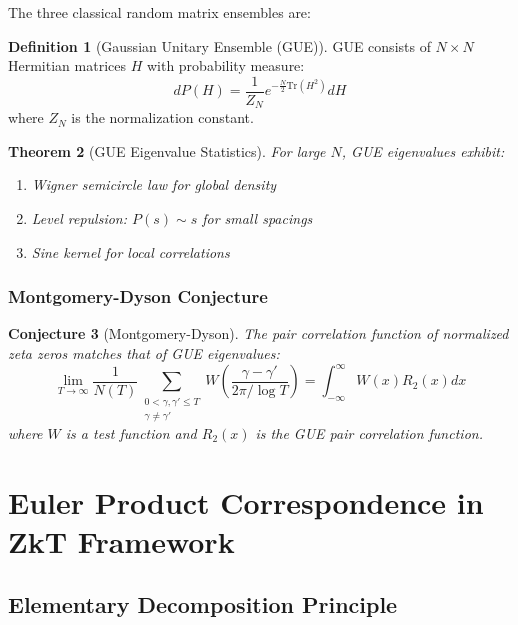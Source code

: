 \documentclass[12pt]{article}
\theoremstyle{plain}
\newtheorem{theorem}{Theorem}[section]
\newtheorem{conjecture}[theorem]{Conjecture}
\theoremstyle{definition}
\newtheorem{definition}[theorem]{Definition}
\begin{document}
The three classical random matrix ensembles are:

\begin{definition}[Gaussian Unitary Ensemble (GUE)]
GUE consists of $N \times N$ Hermitian matrices $H$ with probability measure:
\begin{equation}
dP(H) = \frac{1}{Z_N} e^{-\frac{N}{2}\text{Tr}(H^2)} dH
\end{equation}
where $Z_N$ is the normalization constant.
\end{definition}

\begin{theorem}[GUE Eigenvalue Statistics]
For large $N$, GUE eigenvalues exhibit:
\begin{enumerate}
\item Wigner semicircle law for global density
\item Level repulsion: $P(s) \sim s$ for small spacings
\item Sine kernel for local correlations
\end{enumerate}
\end{theorem}

\subsubsection{Montgomery-Dyson Conjecture}

\begin{conjecture}[Montgomery-Dyson]
The pair correlation function of normalized zeta zeros matches that of GUE eigenvalues:
\begin{equation}
\lim_{T \to \infty} \frac{1}{N(T)} \sum_{\substack{0 < \gamma, \gamma' \leq T \\ \gamma \neq \gamma'}} W\left(\frac{\gamma - \gamma'}{2\pi/\log T}\right) = \int_{-\infty}^{\infty} W(x) R_2(x) dx
\end{equation}
where $W$ is a test function and $R_2(x)$ is the GUE pair correlation function.
\end{conjecture}

\section{Euler Product Correspondence in ZkT Framework}

\subsection{Elementary Decomposition Principle}
\end{document}
